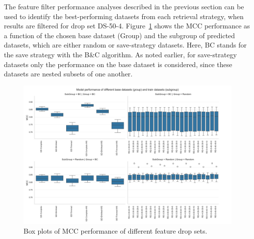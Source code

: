 The feature filter performance analyses described in the previous section can be used to identify the best-performing datasets
from each retrieval strategy, when results are filtered for drop set DS-50-4. Figure~\ref{fig:dataset_performance_group_subgroup}
shows the MCC performance as a function of the chosen base dataset (Group) and the subgroup of predicted datasets, which are either
random or save-strategy datasets. Here, BC stands for the save strategy with the B\&C algorithm.
As noted earlier, for save-strategy datasets only the performance on the base dataset is considered,
since these datasets are nested subsets of one another.
\begin{figure}[ht]
    \centering
    \includegraphics[width =\textwidth]{pictures/feature_filter/group_subgroup_results.png}
    \caption{Box plots of MCC performance of different feature drop sets.}
    \label{fig:dataset_performance_group_subgroup}
\end{figure}


